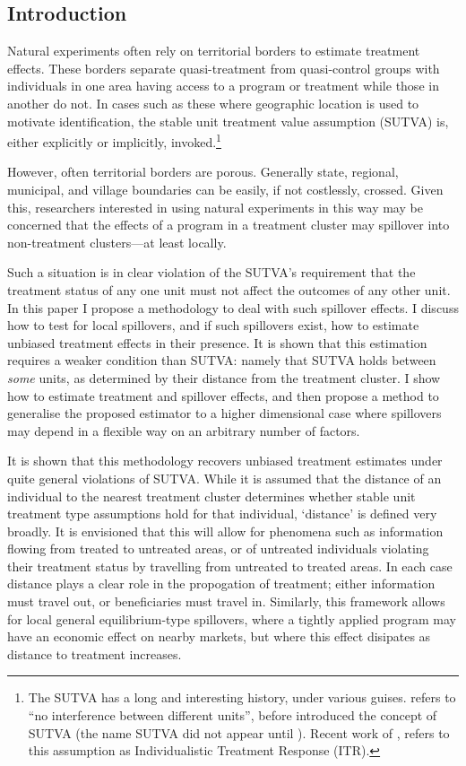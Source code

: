 \documentclass{article}
\begin{document}
\newpage
\begin{spacing}{1.3}
\section{Introduction}
Natural experiments often rely on territorial borders to estimate treatment 
effects.  These borders separate quasi-treatment from quasi-control groups with
individuals in one area having access to a program or treatment while those in 
another do not.  In cases such as these where geographic location is used to 
motivate identification, the stable unit treatment value assumption (SUTVA) is, 
either explicitly or implicitly, invoked.\footnote{The SUTVA has a long and 
interesting history, under various guises. \citet{Cox1958} refers to ``no 
interference between different units'', before \citet{Rubin1978} introduced the 
concept of SUTVA (the name SUTVA did not appear until \citet{Rubin1980}).  
Recent work of \citet{Manski2013}, refers to this assumption as Individualistic 
Treatment Response (ITR).}

However, often territorial borders are porous.  Generally state, regional,
municipal, and village boundaries can be easily, if not costlessly, crossed.
Given this, researchers interested in using natural experiments in this way may
be concerned that the effects of a program in a treatment cluster may spillover 
into non-treatment clusters---at least locally.

Such a situation is in clear violation of the SUTVA's requirement that the treatment
status of any one unit must not affect the outcomes of any other unit.  In this 
paper I propose a methodology to deal with such spillover effects.  I
discuss how to test for local spillovers, and if such spillovers exist, how to 
estimate unbiased treatment effects in their presence.  It is shown that this 
estimation requires a weaker condition than SUTVA: namely that SUTVA holds between 
\emph{some} units, as determined by their distance from the treatment cluster.  I 
show how to estimate treatment and spillover effects, and then
propose a method to generalise the proposed estimator to a higher dimensional 
case where spillovers may depend in a flexible way on an arbitrary number of 
factors.

It is shown that this methodology recovers unbiased treatment
estimates under quite general violations of SUTVA.  While it is
assumed that the distance of an individual to the nearest treatment
cluster determines whether stable unit treatment type assumptions hold
for that individual, `distance' is defined very broadly.  It is
envisioned that this will allow for phenomena such as information
flowing from treated to untreated areas, or of untreated individuals
violating their treatment status by travelling from untreated to
treated areas.  In each case distance plays a clear role in the
propogation of treatment; either information must travel out, or
beneficiaries must travel in. Similarly, this framework allows for
local general equilibrium-type spillovers, where a tightly applied
program may have an economic effect on nearby markets, but where this
effect disipates as distance to treatment increases.


\end{spacing}
\end{document}

